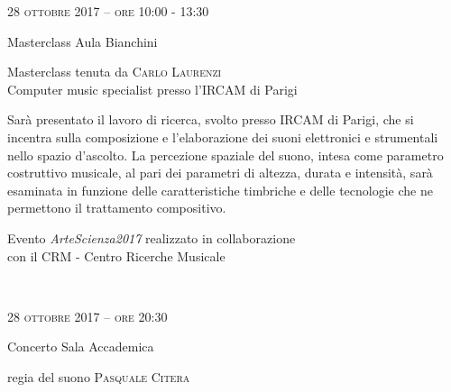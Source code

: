 
\begin{flushright}

\large{
	\scshape{
	28 ottobre 2017 -- ore 10:00 - 13:30
	}}

\medskip
	
\small{Masterclass
	\newline Aula Bianchini}

\medskip

{\fontsize{20}{20} }

\normalfont

\normalsize

\bigskip

Masterclass tenuta da \textsc{Carlo Laurenzi}\\{\footnotesize Computer music specialist presso l'IRCAM di Parigi}


\bigskip

Sarà presentato il lavoro di ricerca, svolto presso IRCAM di Parigi, che si incentra sulla composizione e l’elaborazione dei suoni elettronici e strumentali nello spazio d’ascolto. La percezione spaziale del suono, intesa come parametro costruttivo musicale, al pari dei parametri di altezza, durata e intensità, sarà esaminata in funzione delle caratteristiche timbriche e delle tecnologie che ne permettono il trattamento compositivo.

\bigskip

\small{Evento \textit{ArteScienza2017} realizzato in collaborazione\\con il CRM - Centro Ricerche Musicale}

~\vfill



\large{
	\scshape{
	28 ottobre 2017 -- ore 20:30
	}}

\medskip
	
\small{Concerto
	\newline Sala Accademica}

\medskip

{\fontsize{20}{20} }

\medskip

{\fontsize{40}{40} }

\normalsize

\medskip

regia del suono \textsc{Pasquale Citera}


\end{flushright}
